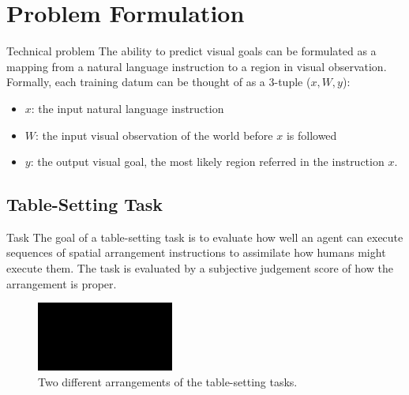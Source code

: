 \documentclass[conference]{IEEEtran}
\begin{document}
\section{Problem Formulation}

\color{red} Technical problem \color{black} The ability to predict visual goals can be formulated as a mapping from a natural language instruction to a region in visual observation. Formally, each training datum can be thought of as a 3-tuple ($x, W, y$):

\begin{itemize}
  \item $x$: the input natural language instruction
  \item $W$: the input visual observation of the world before $x$ is followed
  \item $y$: the output visual goal, the most likely region referred in the instruction $x$. 
\end{itemize}

\subsection{Table-Setting Task}

\color{red} Task \color{black} The goal of a table-setting task is to evaluate how well an agent can execute sequences of spatial arrangement instructions to assimilate how humans might execute them. The task is evaluated by a subjective judgement score of how the arrangement is proper.

\begin{figure}[h]
\begin{center}
\includegraphics[width=0.40\textwidth]{sample}
\end{center}
\caption{Two different arrangements of the table-setting tasks.}
\label{eg-arrangement}
\end{figure}

\end{document}
